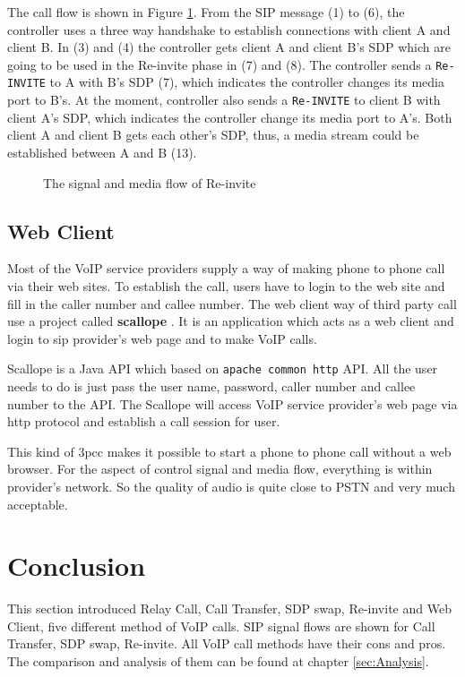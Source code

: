 The call flow is shown in Figure \ref{fig:Re-invite}. From the SIP message (1) to (6), the controller uses a three way handshake to establish connections with client A and client B. In (3) and (4) the controller gets client A and client B's SDP which are going to be used in the Re-invite phase in (7) and (8). The controller sends a \texttt{Re-INVITE} to A with B's SDP (7), which indicates the controller changes its media port to B's. At the moment, controller also sends a \texttt{Re-INVITE} to client B with client A's SDP, which indicates the controller change its media port to A's. Both client A and client B gets each other's SDP, thus, a media stream could be established between A and B (13).

\begin{figure}[!hbtp]
\centering
{}
\caption{The signal and media flow of Re-invite}
\label{fig:Re-invite}
\end{figure}

\subsection{Web Client}
\label{sec:Solution:ThirdPartyCall:WebClient}

Most of the VoIP service providers supply a way of making phone to phone call via their web sites. To establish the call, users have to login to the web site and fill in the caller number and callee number. The web client way of third party call use a project called \textbf{scallope} \cite{ScallopeAPI}. It is an application which acts as a web client and login to sip provider's web page and to make VoIP calls.

Scallope is a Java API which based on \texttt{apache common http} API. All the user needs to do is just pass the user name, password, caller number and callee number to the API. The Scallope will access VoIP service provider's web page via http protocol and establish a call session for user.

This kind of 3pcc makes it possible to start a phone to phone call without a web browser. For the aspect of control signal and media flow, everything is within provider's network. So the quality of audio is quite close to PSTN and very much acceptable.

\section{Conclusion}

This section introduced \textsf{Relay Call}, \textsf{Call Transfer}, \textsf{SDP swap}, \textsf{Re-invite} and \textsf{Web Client}, five different method of VoIP calls. SIP signal flows are shown for \textsf{Call Transfer}, \textsf{SDP swap}, \textsf{Re-invite}. All VoIP call methods have their cons and pros. The comparison and analysis of them can be found at chapter \ref{sec:Analysis}.


